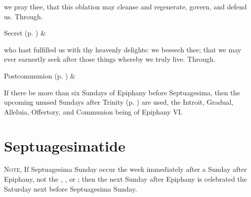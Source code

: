 
\vspace{-0.4\baselineskip}

\secret

\vspace{-0.1\baselineskip}

 we pray thee, that this oblation may cleanse and regenerate, govern, and defend us. Through.


\begin{rubric}
     Secret  (p. \pageref{SPSaints}) \&  
\end{rubric}


\vspace{-0.4\baselineskip}

\postcommunion

\vspace{-0.1\baselineskip}

 who hast fulfilled us with thy heavenly delights: we beseech thee; that we may ever earnestly seek after those things whereby we truly live. Through.
\begin{rubric}
     Postcommunion  (p. \pageref{SPSaints}) \&  
\end{rubric}
\begin{rubric}
    If there be more than six Sundays of Epiphany before Septuagesima, then the upcoming unused Sundays after Trinity (p. \pageref{trinity}) are used, the Introit, Gradual, Alleluia, Offertory, and Communion being of Epiphany VI.
\end{rubric}


\clearpage
\section{Septuagesimatide}

\begin{rubric}
	\textsc{Note,} If Septuagesima Sunday occur the week immediately after a Sunday after Epiphany, not the , , or ; then the next Sunday after Epiphany is celebrated the Saturday next before Septuagesima Sunday.
\end{rubric}

